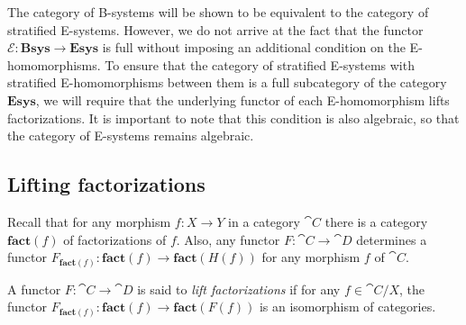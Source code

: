 The category of B-systems will be shown to be equivalent to the category of
stratified E-systems. However, we do not arrive at the fact that the functor
$\mathcal{E}:\mathbf{Bsys}\to\mathbf{Esys}$ is full without imposing an additional
condition on the E-homomorphisms. 
To ensure that the category of stratified E-systems with stratified 
E-homomorphisms between them is a full subcategory of the category 
$\mathbf{Esys}$, we will require that the underlying functor of each E-homomorphism
lifts factorizations. It is
important to note that this condition is also algebraic, so that the category
of E-systems remains algebraic.

\subsection{Lifting factorizations}
Recall
that for any morphism $f:X\to Y$ in a category $\cat{C}$ there is a category
$\mathbf{fact}(f)$ of factorizations of $f$. Also, any functor $F:\cat{C}\to\cat{D}$
determines a functor $F_{\mathbf{fact}(f)}:\mathbf{fact}(f)\to\mathbf{fact}(H(f))$
for any morphism $f$ of $\cat{C}$.

\begin{defn}
A functor $F:\cat{C}\to\cat{D}$ is said to
\emph{lift factorizations} if for any $f\in\cat{C}/X$, the functor
$F_{\mathbf{fact}(f)}:\mathbf{fact}(f)\to\mathbf{fact}(F(f))$ is an isomorphism
of categories. 
\end{defn}

\begin{comment}
\begin{rmk}
We may choose the property of lifting factorizations
to involve either an equivalence or an isomorphism of categories. The
isomorphism-version, would say that for every factorization $h'\circ g'$
of $F(f)$ there is a unique factorization $f\jdeq h\circ g$ in $\cat{C}$ such
that $F(g)\jdeq g'$ and $F(h)\jdeq h'$. In the version with equivalences,
the uniqueness is replaced by uniqueness up to isomorphism, and the equalites
are replaced by an isomorphism in $\mathbf{fact}(F(f))$. 

It is easier to state the isomorphism version of lifting factorizations with
inference rules and it might be easier to explain this condition on type theoretical
grounds, although the equivalence version has the advantage of being
categorical (i.e.~invariant under equivalence of categories).

In the present
context, it doesn't matter very much which one we pick: the categories in which
we're interested are all posets.
\end{rmk}
\end{comment}

